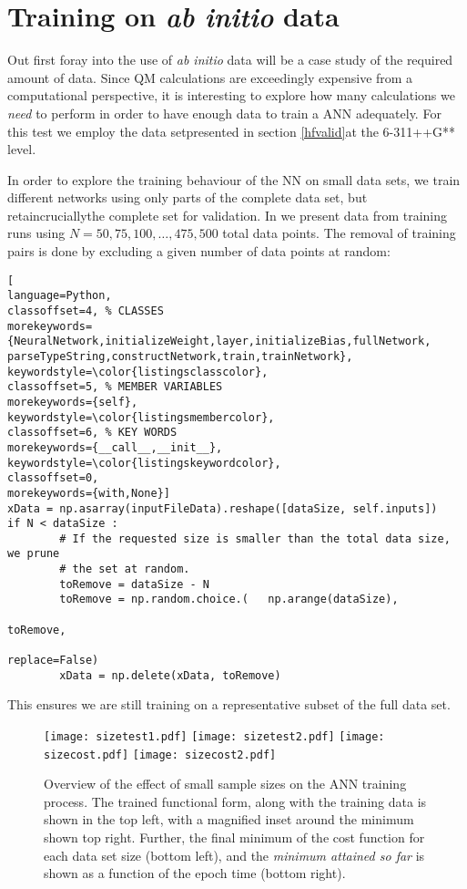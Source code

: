 \documentclass[../../master.tex]{subfiles}
\begin{document}
\newpage
\section{Training on \emph{ab initio} data \label{abinittrain}}
Out first foray into the use of \emph{ab initio} data will be a case study of the required amount of data. Since QM calculations are exceedingly expensive from a computational perspective, it is interesting to explore how many calculations we \emph{need} to perform in order to have enough data to train a ANN adequately. For this test we employ the  data set\textemdash  presented in section \ref{hfvalid}\textemdash at the 6-311++G** level. 

In order to explore the training behaviour of the NN on small data sets, we train different networks using only parts of the complete data set, but retain\textemdash crucially\textemdash the complete set for validation. In  we present data from training runs using $N=50,75,100,\dots,475,500$ total data points. The removal of training pairs is done by excluding a given number of data points at random:
\begin{lstlisting}[
language=Python,
classoffset=4, % CLASSES
morekeywords={NeuralNetwork,initializeWeight,layer,initializeBias,fullNetwork, parseTypeString,constructNetwork,train,trainNetwork},
keywordstyle=\color{listingsclasscolor},
classoffset=5, % MEMBER VARIABLES
morekeywords={self},
keywordstyle=\color{listingsmembercolor},
classoffset=6, % KEY WORDS
morekeywords={__call__,__init__},
keywordstyle=\color{listingskeywordcolor},
classoffset=0,
morekeywords={with,None}]
xData = np.asarray(inputFileData).reshape([dataSize, self.inputs])
if N < dataSize :
		# If the requested size is smaller than the total data size, we prune
		# the set at random.
		toRemove = dataSize - N
		toRemove = np.random.choice.(	np.arange(dataSize), 
																	toRemove, 
																	replace=False)
		xData = np.delete(xData, toRemove)
\end{lstlisting}
This ensures we are still training on a representative subset of the full data set. 

\begin{figure}
\centering
\texttt{[image: sizetest1.pdf]}
\texttt{[image: sizetest2.pdf]}
\texttt{[image: sizecost.pdf]}
\texttt{[image: sizecost2.pdf]}
\caption{Overview of the effect of small sample sizes on the ANN training process. The trained functional form, along with the training data is shown in the top left, with a magnified inset around the minimum shown top right. Further, the final minimum of the cost function for each data set size (bottom left), and the \emph{minimum attained so far} is shown as a function of the epoch time (bottom right).\label{fig:sizes}}
\end{figure}
\end{document}
